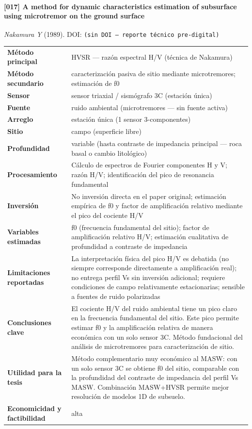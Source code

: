 \paragraph{[017] A method for dynamic characteristics estimation of subsurface using microtremor on the ground surface} \emph{Nakamura Y} (1989).
{\scriptsize DOI: \texttt{(sin DOI --- reporte técnico pre-digital)}}

\begin{center}\scriptsize
\begin{tabularx}{\textwidth}{@{}>{\bfseries}p{3.3cm} X@{}}
\toprule
M\'etodo principal & HVSR --- razón espectral H/V (técnica de Nakamura) \\
M\'etodo secundario & caracterización pasiva de sitio mediante microtremores; estimación de f0 \\
Sensor & sensor triaxial / sismógrafo 3C (estación única) \\
Fuente & ruido ambiental (microtremores --- sin fuente activa) \\
Arreglo & estación única (1 sensor 3-componentes) \\
Sitio & campo (superficie libre) \\
Profundidad & variable (hasta contraste de impedancia principal --- roca basal o cambio litológico) \\
Procesamiento & Cálculo de espectros de Fourier componentes H y V; razón H/V; identificación del pico de resonancia fundamental \\
Inversi\'on & No inversión directa en el paper original; estimación empírica de f0 y factor de amplificación relativo mediante el pico del cociente H/V \\
Variables estimadas & f0 (frecuencia fundamental del sitio); factor de amplificación relativo H/V; estimación cualitativa de profundidad a contraste de impedancia \\
Limitaciones reportadas & La interpretación física del pico H/V es debatida (no siempre corresponde directamente a amplificación real); no entrega perfil Vs sin inversión adicional; requiere condiciones de campo relativamente estacionarias; sensible a fuentes de ruido polarizadas \\
Conclusiones clave & El cociente H/V del ruido ambiental tiene un pico claro en la frecuencia fundamental del sitio. Este pico permite estimar f0 y la amplificación relativa de manera económica con un solo sensor 3C. Método fundacional del análisis de microtremores para caracterización de sitio. \\
Utilidad para la tesis & Método complementario muy económico al MASW: con un solo sensor 3C se obtiene f0 del sitio, comparable con la profundidad del contraste de impedancia del perfil Vs MASW. Combinación MASW+HVSR permite mejor resolución de modelos 1D de subsuelo. \\
Economicidad y factibilidad & alta \\
\bottomrule
\end{tabularx}
\end{center}

